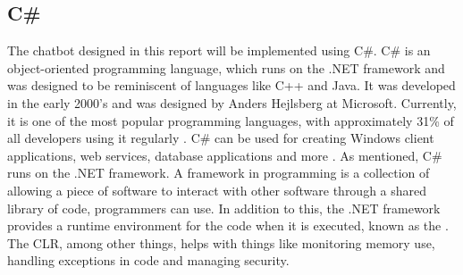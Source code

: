 \subsection{C\#}\label{subsec:Csharp}

The chatbot designed in this report will be implemented using C\#. C\# is an object-oriented programming language, which runs on the .NET framework and was designed to be reminiscent of languages like C++ and Java. It was developed in the early 2000's and was designed by Anders Hejlsberg at Microsoft. Currently, it is one of the most popular programming languages, with approximately 31\% of all developers using it regularly \cite{ArminaMkhitaryan2017WhyWorld}. C\# can be used for creating Windows client applications, web services, database applications and more \cite{2015IntroductionDocs}. 
\newline\newline
As mentioned, C\# runs on the .NET framework. A framework in programming is a collection of  allowing a piece of software to interact with other software through a shared library of code, programmers can use. In addition to this, the .NET framework provides a runtime environment for the code when it is executed, known as the  \cite{WalterGlenn2017WhatPC}. The CLR, among other things, helps with things like monitoring memory use, handling exceptions in code and managing security.